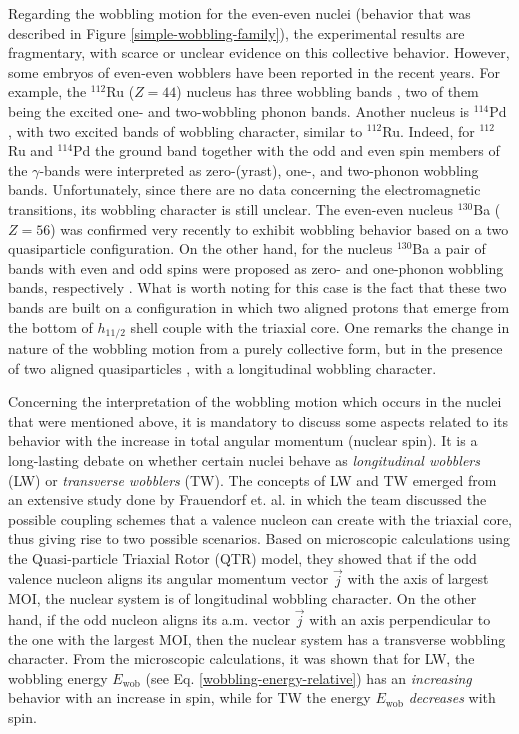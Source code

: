 \documentclass[11pt]{article}
\begin{document}
Regarding the wobbling motion for the even-even nuclei (behavior that was described in Figure \ref{simple-wobbling-family}), the experimental results are fragmentary, with scarce or unclear evidence on this collective behavior. However, some embryos of even-even wobblers have been reported in the recent years. For example, the $^{112}$Ru ($Z=44$) nucleus has three wobbling bands \cite{hamilton2010super}, two of them being the excited one- and two-wobbling phonon bands. Another nucleus is $^{114}$Pd \cite{luo2013triaxial}, with two excited bands of wobbling character, similar to $^{112}$Ru. Indeed, for $^{112}$Ru and $^{114}$Pd the ground band together with the odd and even spin members of the $\gamma$-bands were interpreted as zero-(yrast), one-, and two-phonon wobbling bands. Unfortunately, since there are no data concerning the electromagnetic transitions, its wobbling character is still unclear. The even-even nucleus $^{130}$Ba ($Z=56$) \cite{petrache2019diversity,wang2020two,chen2019transverse} was confirmed very recently to exhibit wobbling behavior based on a two quasiparticle configuration. On the other hand, for the nucleus $^{130}$Ba a pair of bands with even and odd spins were proposed as zero- and one-phonon wobbling bands, respectively \cite{petrache2019diversity}. What is worth noting for this case is the fact that these two bands are built on a configuration in which two aligned protons that emerge from the bottom of $h_{11/2}$ shell couple with the triaxial core. One remarks the change in nature of the wobbling motion from a purely collective form, but in the presence of two aligned quasiparticles \cite{wang2020two}, with a longitudinal wobbling character. 

Concerning the interpretation of the wobbling motion which occurs in the nuclei that were mentioned above, it is mandatory to discuss some aspects related to its behavior with the increase in total angular momentum (nuclear spin). It is a long-lasting debate on whether certain nuclei behave as \emph{longitudinal wobblers} (LW) or \emph{transverse wobblers} (TW). The concepts of LW and TW emerged from an extensive study done by Frauendorf et. al. \cite{frauendorf2014transverse} in which the team discussed the possible coupling schemes that a valence nucleon can create with the triaxial core, thus giving rise to two possible scenarios. Based on microscopic calculations using the Quasi-particle Triaxial Rotor (QTR) model, they showed that if the odd valence nucleon aligns its angular momentum vector $\vec{j}$ with the axis of largest MOI, the nuclear system is of longitudinal wobbling character. On the other hand, if the odd nucleon aligns its a.m. vector $\vec{j}$ with an axis perpendicular to the one with the largest MOI, then the nuclear system has a transverse wobbling character. From the microscopic calculations, it was shown that for LW, the wobbling energy $E_\text{wob}$ (see Eq. \ref{wobbling-energy-relative}) has an \emph{increasing} behavior with an increase in spin, while for TW the energy $E_\text{wob}$ \emph{decreases} with spin.
\end{document}
